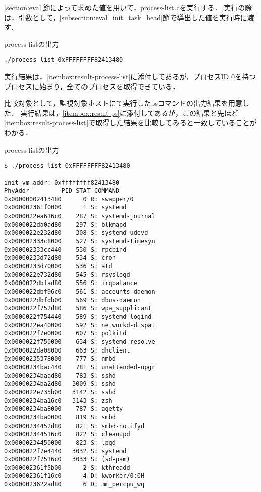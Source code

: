 \ref{section:eval}節によって求めた値を用いて，process-list.cを実行する．
実行の際は，引数として，\ref{subsection:eval_init_task_head}節で導出した値を実行時に渡す．

\begin{itembox}[l]{process-listの出力}
    \begin{verbatim}
./process-list 0xFFFFFFFF82413480
    \end{verbatim}
\end{itembox}

実行結果は，\ref{itembox:result-process-list}に添付してあるが，プロセスID 0を持つプロセスに始まり，全てのプロセスを取得できている．

比較対象として，監視対象ホストにて実行したpsコマンドの出力結果を用意した．
実行結果は，\ref{itembox:result-ps}に添付してあるが，この結果と先ほど\ref{itembox:result-process-list}で取得した結果を比較してみると一致していることがわかる．

\begin{itembox}[l]{process-listの出力}
    \label{itembox:result-process-list}
    \begin{verbatim}
$ ./process-list 0xFFFFFFFF82413480

init_vm_addr: 0xffffffff82413480
PhyAddr         PID STAT COMMAND
0x00000002413480      0 R: swapper/0
0x000002361f0000      1 S: systemd
0x0000022ea616c0    287 S: systemd-journal
0x0000022da0ad80    297 S: blkmapd
0x0000022e232d80    308 S: systemd-udevd
0x000002333c8000    527 S: systemd-timesyn
0x000002333cc440    530 S: rpcbind
0x00000233d72d80    534 S: cron
0x00000233d70000    536 S: atd
0x0000022e732d80    545 S: rsyslogd
0x0000022dbfad80    556 S: irqbalance
0x0000022dbf96c0    561 S: accounts-daemon
0x0000022dbfdb00    569 S: dbus-daemon
0x0000022f752d80    586 S: wpa_supplicant
0x0000022f754440    589 S: systemd-logind
0x0000022ea40000    592 S: networkd-dispat
0x0000022f7e0000    607 S: polkitd
0x0000022f750000    634 S: systemd-resolve
0x0000022da08000    663 S: dhclient
0x00000235378000    777 S: nmbd
0x00000234bac440    781 S: unattended-upgr
0x00000234baad80    783 S: sshd
0x00000234ba2d80   3009 S: sshd
0x0000022e735b00   3142 S: sshd
0x00000234ba16c0   3143 S: zsh
0x00000234ba8000    787 S: agetty
0x00000234ba0000    819 S: smbd
0x00000234452d80    821 S: smbd-notifyd
0x000002344516c0    822 S: cleanupd
0x00000234450000    823 S: lpqd
0x0000022f7e4440   3032 S: systemd
0x0000022f7516c0   3033 S: (sd-pam)
0x000002361f5b00      2 S: kthreadd
0x000002361f16c0      4 D: kworker/0:0H
0x0000023622ad80      6 D: mm_percpu_wq
    \end{verbatim}
\end{itembox}

